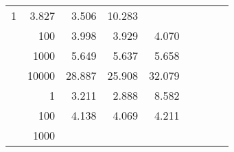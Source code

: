 \begin{table}
\begin{tabular}{rrrrrrrrr}
					\multirow{ 1 }{*}{ 1 } &
					
						
							    
							    
	                           3.827 & 3.506 & 10.283  \\
	                
	            
					 &  
					 
					\multirow{ 1 }{*}{ 100 } &
					
						
							    
							    
	                           3.998 & 3.929 & 4.070  \\
	                
	            
					 &  
					 
					\multirow{ 1 }{*}{ 1000 } &
					
						
							    
							    
	                           5.649 & 5.637 & 5.658  \\
	                
	            
					 &  
					 
					\multirow{ 1 }{*}{ 10000 } &
					
						
							    
							    
	                           28.887 & 25.908 & 32.079  \\
	                
	            
	        
				\noalign{\smallskip}\hline
				\multirow{ 4 }{*}{ 160000 } &
				
					
					 
					\multirow{ 1 }{*}{ 1 } &
					
						
							    
							    
	                           3.211 & 2.888 & 8.582  \\
	                
	            
					 &  
					 
					\multirow{ 1 }{*}{ 100 } &
					
						
							    
							    
	                           4.138 & 4.069 & 4.211  \\
	                
	            
					 &  
					 
					\multirow{ 1 }{*}{ 1000 } &
					
						
							    

\end{tabular}
\end{table}
